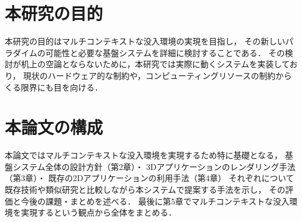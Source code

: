 \section{本研究の目的}

本研究の目的はマルチコンテキストな没入環境の実現を目指し，
その新しいパラダイムの可能性と必要な基盤システムを詳細に検討することである．
その検討が机上の空論とならないために，本研究では実際に動くシステムを実装しており，
現状のハードウェア的な制約や，コンピューティングリソースの制約からくる限界にも目を向ける．


\section{本論文の構成}

本論文ではマルチコンテキストな没入環境を実現するため特に基礎となる，
基盤システム全体の設計方針（第2章）・
3Dアプリケーションのレンダリング手法（第3章）・
既存の2Dアプリケーションの利用手法（第4章）
それぞれについて既存技術や類似研究と比較しながら本システムで提案する手法を示し，
その評価と今後の課題・まとめを述べる．
最後に第5章でマルチコンテキストな没入環境を実現するという観点から全体をまとめる．
